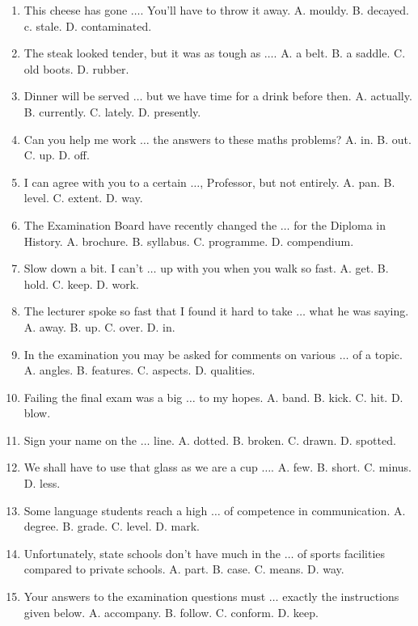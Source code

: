 \documentclass{article}
\numberwithin{equation}{section}
\begin{document}
\begin{enumerate}[leftmargin=2mm]
	\item This cheese has gone $\ldots$. You'll have to throw it away. {\sf A.} mouldy. {\sf B.} decayed. c. stale. {\sf D.} contaminated.
	\item The steak looked tender, but it was as tough as $\ldots$. {\sf A.} a belt. {\sf B.} a saddle. {\sf C.} old boots. {\sf D.} rubber.
	\item Dinner will be served $\ldots$ but we have time for a drink before then. {\sf A.} actually. {\sf B.} currently. {\sf C.} lately. {\sf D.} presently.
	\item Can you help me work $\ldots$ the answers to these maths problems? {\sf A.} in. {\sf B.} out. {\sf C.} up. {\sf D.} off.
	\item I can agree with you to a certain $\ldots$, Professor, but not entirely. {\sf A.} pan. {\sf B.} level. {\sf C.} extent. {\sf D.} way.
	\item The Examination Board have recently changed the $\ldots$ for the Diploma in History. {\sf A.} brochure. {\sf B.} syllabus. {\sf C.} programme. {\sf D.} compendium.
	\item Slow down a bit. I can't $\ldots$ up with you when you walk so fast. {\sf A.} get. {\sf B.} hold. {\sf C.} keep. {\sf D.} work.
	\item The lecturer spoke so fast that I found it hard to take $\ldots$ what he was saying. {\sf A.} away. {\sf B.} up. {\sf C.} over. {\sf D.} in.
	\item In the examination you may be asked for comments on various $\ldots$ of a topic. {\sf A.} angles. {\sf B.} features. {\sf C.} aspects. {\sf D.} qualities.
	\item Failing the final exam was a big $\ldots$ to my hopes. {\sf A.} band. {\sf B.} kick. {\sf C.} hit. {\sf D.} blow.
	\item Sign your name on the $\ldots$ line. {\sf A.} dotted. {\sf B.} broken. {\sf C.} drawn. {\sf D.} spotted.
	\item We shall have to use that glass as we are a cup $\ldots$. {\sf A.} few. {\sf B.} short. {\sf C.} minus. {\sf D.} less.
	\item Some language students reach a high $\ldots$ of competence in communication. {\sf A.} degree. {\sf B.} grade. {\sf C.} level. {\sf D.} mark.
	\item Unfortunately, state schools don't have much in the $\ldots$ of sports facilities compared to private schools. {\sf A.} part. {\sf B.} case. {\sf C.} means. {\sf D.} way.
	\item Your answers to the examination questions must $\ldots$ exactly the instructions given below. {\sf A.} accompany. {\sf B.} follow. {\sf C.} conform. {\sf D.} keep.

\end{enumerate}
\end{document}
